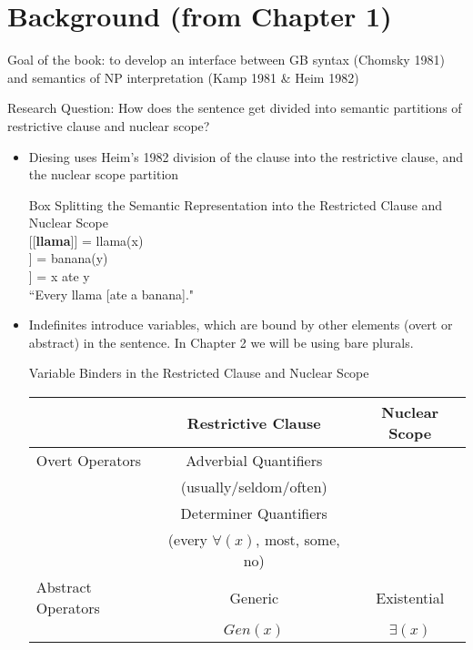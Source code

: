 \documentclass[landscape]{article}
\newcommand{\doublebr}[1]{[\hspace{-.02in}[{\bf #1}]\hspace{-.02in}]}
\begin{document}
\section{Background (from Chapter 1)}
Goal of the book: to develop an interface between GB syntax (Chomsky 1981) and semantics of NP interpretation (Kamp 1981 \& Heim 1982)

\begin{example}
Research Question: How does the sentence get divided into semantic partitions of restrictive clause and nuclear scope?
\end{example}

\begin{itemize}


\item Diesing uses Heim's 1982 division of the clause into the restrictive clause, and the nuclear scope partition


\begin{example}Box Splitting the Semantic Representation into the Restricted Clause and Nuclear Scope\label{boxsplitting}\\

\doublebr{llama} = llama(x)\\
\doublebr{banana} = banana(y)\\
\doublebr{ate} = x ate y\\
``Every llama [ate a banana]."\\

\end{example}

\item Indefinites introduce variables, which are bound by other elements (overt or abstract) in the sentence. In Chapter 2 we will be using bare plurals.

\begin{example}Variable Binders in the Restricted Clause and Nuclear Scope\\
\begin{tabular}{|l||c|c|}\hline
 &Restrictive Clause & Nuclear Scope\\\hline \hline
Overt Operators & Adverbial Quantifiers &  \\
& (usually/seldom/often) & \\\hline
& Determiner Quantifiers & \\
& (every $\forall (x)$, most, some, no) & \\\hline\hline
Abstract Operators & Generic & Existential\\
& $Gen(x)$ & $\exists (x)$\\\hline


\end{tabular}
\end{example}
\end{itemize}
\end{document}
